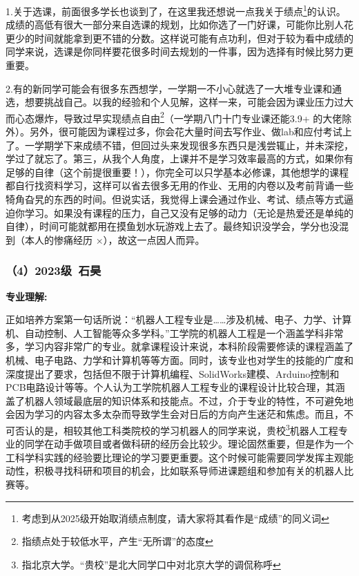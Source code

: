 \documentclass[11pt,oneside]{book}
\begin{document}
1.关于选课，前面很多学长也谈到了，在这里我还想说一点我关于绩点\footnote{考虑到从2025级开始取消绩点制度，请大家将其看作是“成绩”的同义词}的认识。成绩的高低有很大一部分来自选课的规划，比如你选了一门好课，可能你比别人花更少的时间就能拿到更不错的分数。这样说可能有点功利，但对于较为看中成绩的同学来说，选课是你同样要花很多时间去规划的一件事，因为选择有时候比努力更重要。

\vspace{10pt}

2.有的新同学可能会有很多东西想学，一学期一不小心就选了一大堆专业课和通选，想要挑战自己。以我的经验和个人见解，这样一来，可能会因为课业压力过大而心态爆炸，导致过早实现绩点自由\footnote{指绩点处于较低水平，产生“无所谓”的态度}（一学期八门十门专业课还能3.9+ 的大佬除外）。另外，很可能因为课程过多，你会花大量时间去写作业、做lab和应付考试上了。一学期学下来成绩不错，但回过头来发现很多东西只是浅尝辄止，并未深挖，学过了就忘了。第三，从我个人角度，上课并不是学习效率最高的方式，如果你有足够的自律（这个前提很重要！），你完全可以只学基本必修课，其他想学的课程都自行找资料学习，这样可以省去很多无用的作业、无用的内卷以及考前背诵一些犄角旮旯的东西的时间。但说实话，我觉得上课会通过作业、考试、绩点等方式逼迫你学习。如果没有课程的压力，自己又没有足够的动力（无论是热爱还是单纯的自律），时间可能就都用在摸鱼划水玩游戏上去了。最终知识没学会，学分也没混到（本人的惨痛经历 ×），故这一点因人而异。

\subsubsection{（4）2023级\ 石昊}

\textbf{专业理解:}

正如培养方案第一句话所说：“机器人工程专业是……涉及机械、电子、力学、计算机、自动控制、人工智能等众多学科。”工学院的机器人工程是一个涵盖学科非常多，学习内容非常广的专业。就拿课程设计来说，本科阶段需要修读的课程涵盖了机械、电子电路、力学和计算机等等方面。同时，该专业也对学生的技能的广度和深度提出了要求，包括但不限于计算机编程、SolidWorks建模、Arduino控制和PCB电路设计等等。个人认为工学院机器人工程专业的课程设计比较合理，其涵盖了机器人领域最底层的知识体系和技能点。不过，介于专业的特性，不可避免地会因为学习的内容太多太杂而导致学生会对日后的方向产生迷茫和焦虑。而且，不可否认的是，相较其他工科类院校的学习机器人的同学来说，贵校\footnote{指北京大学。“贵校”是北大同学口中对北京大学的调侃称呼}机器人工程专业的同学在动手做项目或者做科研的经历会比较少。理论固然重要，但是作为一个工科学科实践的经验要比理论的学习要更重要。这个时候可能需要同学发挥主观能动性，积极寻找科研和项目的机会，比如联系导师进课题组和参加有关的机器人比赛等。
\end{document}
